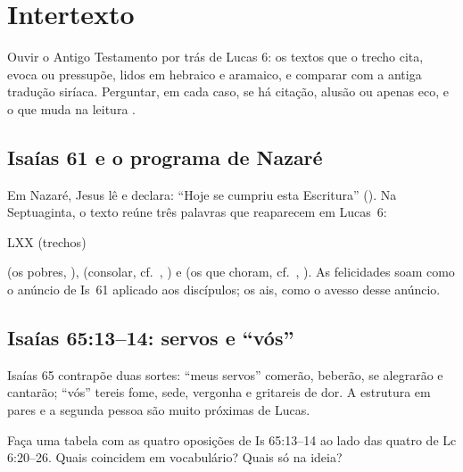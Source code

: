 \chapter{Intertexto}\label{cap:intertexto}

\begin{objetivo}
Ouvir o Antigo Testamento por trás de Lucas 6: os textos que o trecho cita,
evoca ou pressupõe, lidos em hebraico e aramaico, e comparar com a antiga
tradução siríaca. Perguntar, em cada caso, se há citação, alusão ou apenas
eco, e o que muda na leitura \parencite{beale2007}.
\end{objetivo}

\section{Isaías 61 e o programa de Nazaré}

Em Nazaré, Jesus lê  e declara: \enquote{Hoje se cumpriu esta
Escritura} (). Na Septuaginta, o texto reúne três palavras que
reaparecem em Lucas~6:

\begin{citacao}{ LXX (trechos)}
\end{citacao}

\noindent {} (os pobres, ), 
(consolar, cf.\ , ) e  (os que choram,
cf.\ , ). As felicidades soam como o anúncio de Is~61
aplicado aos discípulos; os ais, como o avesso desse anúncio.

\section{Isaías 65:13–14: servos e \enquote{vós}}

Isaías 65 contrapõe duas sortes: \enquote{meus servos} comerão, beberão,
se alegrarão e cantarão; \enquote{vós} tereis fome, sede, vergonha e
gritareis de dor. A estrutura em pares e a segunda pessoa são muito
próximas de Lucas.


\begin{pergunta}
Faça uma tabela com as quatro oposições de Is 65:13–14 ao lado das quatro
de Lc 6:20–26. Quais coincidem em vocabulário? Quais só na ideia?
\end{pergunta}

